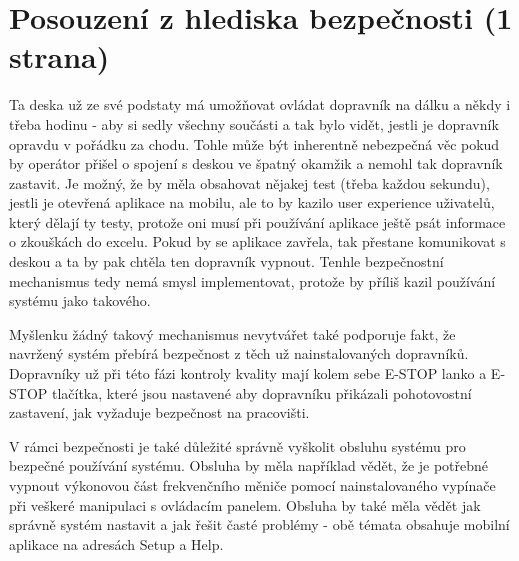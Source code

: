 \section{Posouzení z hlediska bezpečnosti (1 strana)}

Ta deska už ze své podstaty má umožňovat ovládat dopravník na dálku a někdy i třeba hodinu - aby si sedly všechny součásti a tak bylo vidět, jestli je dopravník opravdu v pořádku za chodu. Tohle může být inherentně nebezpečná věc pokud by operátor přišel o spojení s deskou ve špatný okamžik a nemohl tak dopravník zastavit. Je možný, že by měla obsahovat nějakej test (třeba každou sekundu), jestli je otevřená aplikace na mobilu, ale to by kazilo user experience uživatelů, který dělají ty testy, protože oni musí při používání aplikace ještě psát informace o zkouškách do excelu. Pokud by se aplikace zavřela, tak přestane komunikovat s deskou a ta by pak chtěla ten dopravník vypnout. Tenhle bezpečnostní mechanismus tedy nemá smysl implementovat, protože by příliš kazil používání systému jako takového.

Myšlenku žádný takový mechanismus nevytvářet také podporuje fakt, že navržený systém přebírá bezpečnost z těch už nainstalovaných dopravníků. Dopravníky už při této fázi kontroly kvality mají kolem sebe E-STOP lanko a E-STOP tlačítka, které jsou nastavené aby dopravníku přikázali pohotovostní zastavení, jak vyžaduje bezpečnost na pracovišti.

V rámci bezpečnosti je také důležité správně vyškolit obsluhu systému pro bezpečné používání systému. Obsluha by měla například vědět, že je potřebné vypnout výkonovou část frekvenčního měniče pomocí nainstalovaného vypínače při veškeré manipulaci s ovládacím panelem. Obsluha by také měla vědět jak správně systém nastavit a jak řešit časté problémy - obě témata obsahuje mobilní aplikace na adresách Setup a Help.

